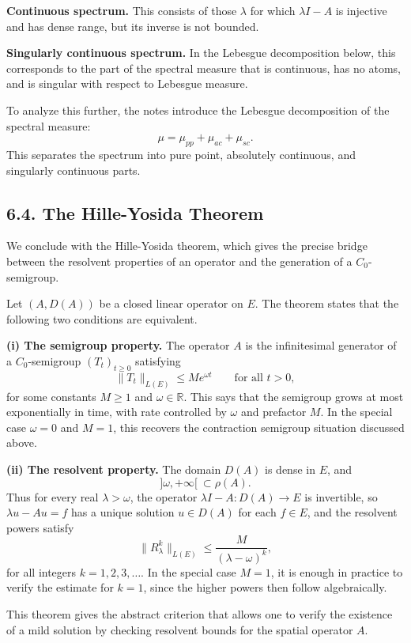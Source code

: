 \documentclass[11pt]{article}
\theoremstyle{definition}
\theoremstyle{remark}
\begin{document}
\textbf{Continuous spectrum.} This consists of those \(\lambda\) for which \(\lambda I-A\) is injective and has dense range, but its inverse is not bounded.

\textbf{Singularly continuous spectrum.} In the Lebesgue decomposition below, this corresponds to the part of the spectral measure that is continuous, has no atoms, and is singular with respect to Lebesgue measure.

To analyze this further, the notes introduce the Lebesgue decomposition of the spectral measure:
\[
\mu=\mu_{pp}+\mu_{ac}+\mu_{sc}.
\]
This separates the spectrum into pure point, absolutely continuous, and singularly continuous parts.

\subsection*{6.4. The Hille-Yosida Theorem}
We conclude with the Hille-Yosida theorem, which gives the precise bridge between the resolvent properties of an operator and the generation of a \(C_0\)-semigroup.

Let \((A,D(A))\) be a closed linear operator on \(E\). The theorem states that the following two conditions are equivalent.

\textbf{(i) The semigroup property.} The operator \(A\) is the infinitesimal generator of a \(C_0\)-semigroup \((T_t)_{t\ge 0}\) satisfying
\[
\|T_t\|_{L(E)}\le Me^{\omega t}
\qquad \text{for all } t>0,
\]
for some constants \(M\ge 1\) and \(\omega\in\mathbb R\).
This says that the semigroup grows at most exponentially in time, with rate controlled by \(\omega\) and prefactor \(M\).
In the special case \(\omega=0\) and \(M=1\), this recovers the contraction semigroup situation discussed above.

\textbf{(ii) The resolvent property.} The domain \(D(A)\) is dense in \(E\), and
\[
]\omega,+\infty[\ \subset \rho(A).
\]
Thus for every real \(\lambda>\omega\), the operator \(\lambda I-A:D(A)\to E\) is invertible, so \(\lambda u-Au=f\) has a unique solution \(u\in D(A)\) for each \(f\in E\), and the resolvent powers satisfy
\[
\|R_\lambda^k\|_{L(E)}
\le
\frac{M}{(\lambda-\omega)^k},
\]
for all integers \(k=1,2,3,\dots\). In the special case \(M=1\), it is enough in practice to verify the estimate for \(k=1\), since the higher powers then follow algebraically.

This theorem gives the abstract criterion that allows one to verify the existence of a mild solution by checking resolvent bounds for the spatial operator \(A\).
\end{document}
